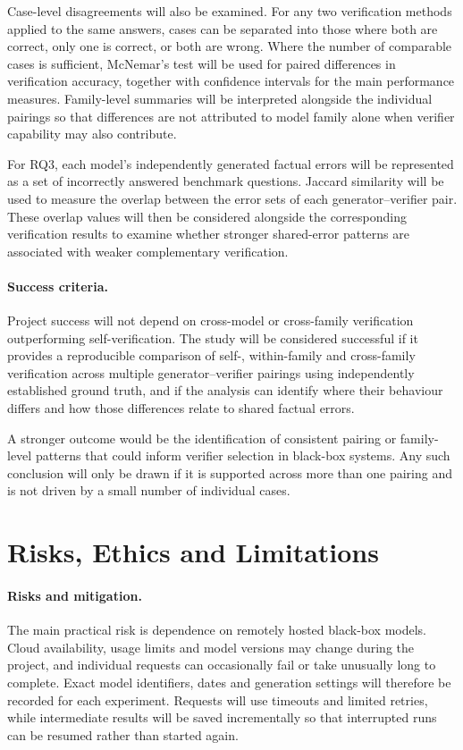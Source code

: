 \documentclass[11pt,a4paper]{article}
\begin{document}
	Case-level disagreements will also be examined. For any two verification methods applied to the same answers, cases can be separated into those where both are correct, only one is correct, or both are wrong. Where the number of comparable cases is sufficient, McNemar's test will be used for paired differences in verification accuracy, together with confidence intervals for the main performance measures. Family-level summaries will be interpreted alongside the individual pairings so that differences are not attributed to model family alone when verifier capability may also contribute.
	
	For RQ3, each model's independently generated factual errors will be represented as a set of incorrectly answered benchmark questions. Jaccard similarity will be used to measure the overlap between the error sets of each generator--verifier pair. These overlap values will then be considered alongside the corresponding verification results to examine whether stronger shared-error patterns are associated with weaker complementary verification.
	
	\paragraph{Success criteria.}
	Project success will not depend on cross-model or cross-family verification outperforming self-verification. The study will be considered successful if it provides a reproducible comparison of self-, within-family and cross-family verification across multiple generator--verifier pairings using independently established ground truth, and if the analysis can identify where their behaviour differs and how those differences relate to shared factual errors.
	
	A stronger outcome would be the identification of consistent pairing or family-level patterns that could inform verifier selection in black-box systems. Any such conclusion will only be drawn if it is supported across more than one pairing and is not driven by a small number of individual cases.
	
	\section{Risks, Ethics and Limitations}
	
	\paragraph{Risks and mitigation.}
	The main practical risk is dependence on remotely hosted black-box models. Cloud availability, usage limits and model versions may change during the project, and individual requests can occasionally fail or take unusually long to complete. Exact model identifiers, dates and generation settings will therefore be recorded for each experiment. Requests will use timeouts and limited retries, while intermediate results will be saved incrementally so that interrupted runs can be resumed rather than started again.
	
\end{document}
